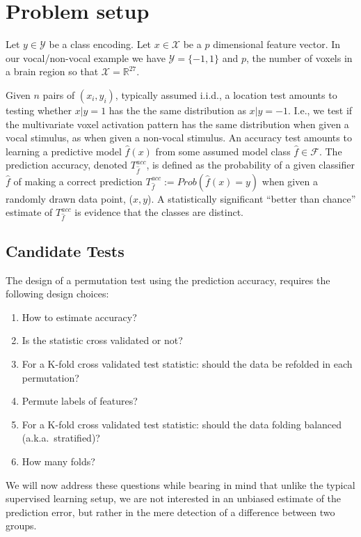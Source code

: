 \documentclass[12pt,a4paper]{article}
\newcommand{\set}[1]{\{ #1 \}} %
\newcommand{\reals}{\mathbb{R}} %
\newcommand{\features}{x} %
\newcommand{\outcomes}{y} %
\newcommand{\featureS}{\mathcal{X}} %
\newcommand{\outcomeS}{\mathcal{Y}} %
\newcommand{\hyp}{f} %
\newcommand{\hypEstim}{\hat{\hyp}} %
\newcommand{\hypclass}{\mathcal{F}}
\newcommand{\acc}{T^{acc}}
\newcommand{\prob}[1]{Prob( #1 )} %
\begin{document}
\section{Problem setup}
\label{sec:problem_setup}

Let $\outcomes \in \outcomeS$ be a class encoding. 
Let $\features \in \featureS$ be a $p$ dimensional feature vector. 
In our vocal/non-vocal example we have $\outcomeS=\set{-1,1}$ and $p$, the number of voxels in a brain region so that $\featureS=\reals^{27}$. 

Given $n$ pairs of $(\features_i,\outcomes_i)$, typically assumed i.i.d., a location test amounts to testing whether $\features|\outcomes=1$ has the the same distribution as $\features|\outcomes=-1$. 
I.e., we test if the multivariate voxel activation pattern has the same distribution when given a vocal stimulus, as when given a non-vocal stimulus. 
An accuracy test amounts to learning a predictive model $\hypEstim(\features)$ from some assumed model class $\hypEstim \in \hypclass$. 
The prediction accuracy, denoted $\acc_{\hypEstim}$, is defined as the probability of a given classifier $\hypEstim$ of making a correct prediction $\acc_{\hypEstim}:=\prob{\hypEstim(x)=y}$ when given a randomly drawn data point, ($\features,\outcomes$).
A statistically significant ``better than chance'' estimate of $\acc_{\hypEstim}$ is evidence that the classes are distinct. 


\subsection{Candidate Tests}
\label{sec:considerations}

The design of a permutation test using the prediction accuracy, requires the following design choices: 
\begin{enumerate}
\item How to estimate accuracy?
\item Is the statistic cross validated or not?
\item For a K-fold cross validated test statistic: should the data be refolded in each permutation? 
\item Permute labels of features?
\item For a K-fold cross validated test statistic: should the data folding balanced (a.k.a.\ stratified)?
\item How many folds? 
\end{enumerate}

We will now address these questions while bearing in mind that unlike the typical supervised learning setup, we are not interested in an unbiased estimate of the prediction error, but rather in the mere detection of a difference between two groups. 
\end{document}
